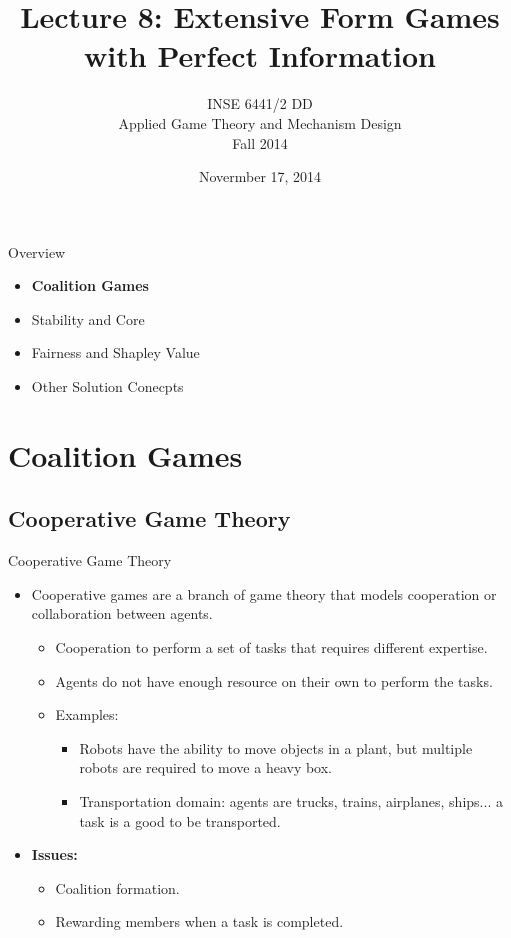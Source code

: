 \documentclass{beamer}
\title[Lecture 8: Extensive Form Games with Perfect Information]{Lecture 8: Extensive Form Games with Perfect Information}
\author{INSE 6441/2 DD\\ \vspace{0.2cm} Applied Game Theory and Mechanism Design \\ Fall 2014}
\institute{Department of Computer Science and Software Engineering\\Concordia University}
\date{Novermber 17, 2014}
\begin{document}
\begin{frame}
\titlepage
\end{frame}

\begin{frame}{Overview}
    \begin{itemize}
     	\itemsep=.5cm
    	\item {\bf Coalition Games}
    	\item Stability and Core
    	\item Fairness and Shapley Value
    	\item Other Solution Conecpts
    \end{itemize}
\end{frame}


\section{Coalition Games}
\subsection{Cooperative Game Theory}

\begin{frame}{Cooperative Game Theory}
  \begin{itemize}
     \item Cooperative games are a branch of game theory that models cooperation or collaboration between agents.
     \begin{itemize}
        \item Cooperation to perform a set of tasks that requires different expertise.
        \item Agents do not have enough resource on their own to perform the tasks.
        \item Examples:
        \begin{itemize}
            \item Robots have the ability to move objects in a plant, but multiple robots are required to move a heavy box.
            \item Transportation domain: agents are trucks, trains, airplanes, ships... a task is a good to be transported.
        \end{itemize}
    \end{itemize}
    \item \textbf{Issues:}
        \begin{itemize}
            \item Coalition formation.
            \item Rewarding members when a task is completed.
        \end{itemize}
  \end{itemize}
\end{frame}
\end{document}
